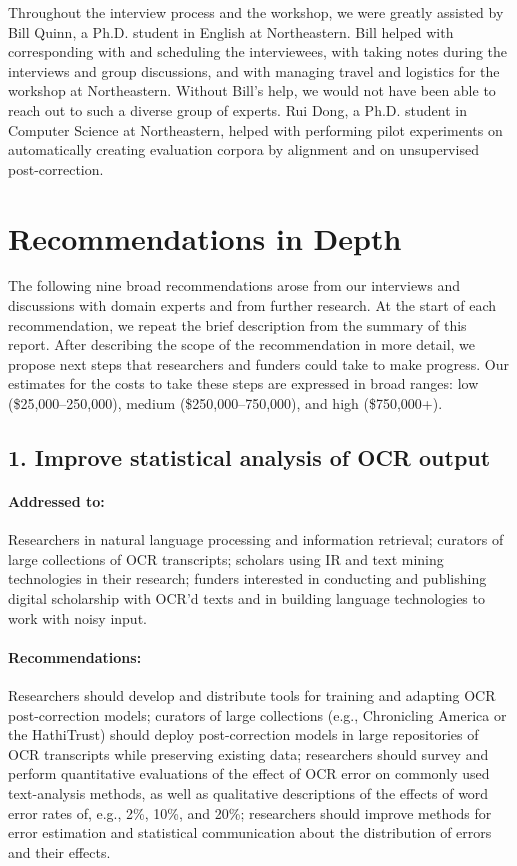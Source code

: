 \documentclass[twoside,11pt]{report}
\begin{document}
Throughout the interview process and the workshop, we were greatly assisted by Bill Quinn, a Ph.D. student in English at Northeastern. Bill helped with corresponding with and scheduling the interviewees, with taking notes during the interviews and group discussions, and with managing travel and logistics for the workshop at Northeastern. Without Bill's help, we would not have been able to reach out to such a diverse group of experts. Rui Dong, a Ph.D. student in Computer Science at Northeastern, helped with performing pilot experiments on automatically creating evaluation corpora by alignment and on unsupervised post-correction.

\newpage

\section{Recommendations in Depth}

The following nine broad recommendations arose from our interviews and discussions with domain experts and from further research. At the start of each recommendation, we repeat the brief description from the summary of this report. After describing the scope of the recommendation in more detail, we propose next steps that researchers and funders could take to make progress. Our estimates for the costs to take these steps are expressed in broad ranges: low (\$25,000--250,000), medium (\$250,000--750,000), and high (\$750,000+).

\subsection{1. Improve statistical analysis of OCR output}
\label{sec:rec-stats}

\paragraph{Addressed to:} Researchers in natural language processing and information retrieval; curators of large collections of OCR transcripts; scholars using IR and text mining technologies in their research; funders interested in conducting and publishing digital scholarship with OCR'd texts and in building language technologies to work with noisy input.

\paragraph{Recommendations:} Researchers should develop and distribute tools for training and adapting OCR post-correction models; curators of large collections (e.g., Chronicling America or the HathiTrust) should deploy post-correction models in large repositories of OCR transcripts while preserving existing data; researchers should survey and perform quantitative evaluations of the effect of OCR error on commonly used text-analysis methods, as well as qualitative descriptions of the effects of word error rates of, e.g., 2\%, 10\%, and 20\%; researchers should improve methods for error estimation and statistical communication about the distribution of errors and their effects.
\end{document}
